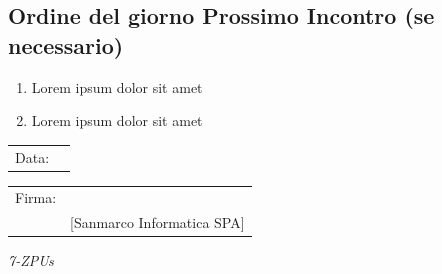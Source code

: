 \documentclass[a4paper,12pt]{article}
\begin{document}
\subsection{Ordine del giorno Prossimo Incontro (se necessario)}
\begin{enumerate}
    \item Lorem ipsum dolor sit amet
    \item Lorem ipsum dolor sit amet
\end{enumerate}

\vfill


\begin{flushleft}
\begin{tabular}{@{}p{0.5in}p{2in}@{}}
Data: & \hrulefill \\
\end{tabular}

\vspace{1em}

\begin{tabular}{@{}p{0.5in}p{2in}@{}}
Firma: & \hrulefill \\
& [Sanmarco Informatica SPA] \\
\end{tabular}
\end{flushleft}

\begin{flushright}
    \textit{7-ZPUs}
\end{flushright}
\end{document}
